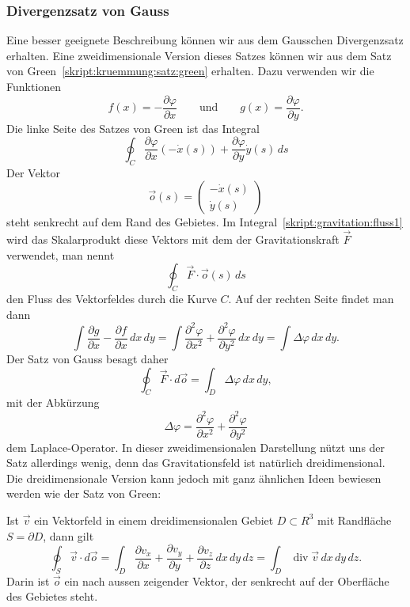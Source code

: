 \subsubsection{Divergenzsatz von Gauss}
Eine besser geeignete Beschreibung können wir aus dem Gausschen
Divergenzsatz erhalten.
Eine zweidimensionale Version dieses Satzes können wir
aus dem Satz von Green~\eqref{skript:kruemmung:satz:green}
erhalten.
Dazu verwenden wir die Funktionen 
\[
f(x)=-\frac{\partial \varphi}{\partial x}
\qquad\text{und}\qquad
g(x)=\frac{\partial \varphi}{\partial y}.
\]
Die linke Seite des Satzes von Green ist das Integral
\begin{equation}
\oint_{C}
\frac{\partial \varphi}{\partial x} (-\dot x(s))
+
\frac{\partial \varphi}{\partial y} \dot y(s)
\,ds
\label{skript:gravitation:fluss1}
\end{equation}
Der Vektor
\[
\vec o(s) = \begin{pmatrix}-\dot x(s)\\\dot y(s)\end{pmatrix}
\]
steht senkrecht auf dem Rand des Gebietes.
Im Integral~\eqref{skript:gravitation:fluss1} wird das Skalarprodukt
diese Vektors mit dem der Gravitationskraft $\vec F$ verwendet,
man nennt
\[
\oint_{C} \vec F\cdot \vec o(s)\,ds
\]
den Fluss des Vektorfeldes durch die Kurve $C$.
Auf der rechten Seite findet man dann 
\[
\int \frac{\partial g}{\partial x}-\frac{\partial f}{\partial x}\,dx\,dy
=
\int
\frac{\partial^2\varphi}{\partial x^2}
+
\frac{\partial^2\varphi}{\partial y^2}
\,dx\,dy
=
\int\Delta\varphi \,dx\,dy.
\]
Der Satz von Gauss besagt daher
\[
\oint_{C} \vec F\cdot d\vec o
=
\int_{D} \Delta\varphi\,dx\,dy,
\]
mit der Abkürzung
\begin{equation*}
\Delta \varphi
=
\frac{\partial^2\varphi}{\partial x^2}+
\frac{\partial^2\varphi}{\partial y^2}
\end{equation*}
dem Laplace-Operator.
In dieser zweidimensionalen Darstellung nützt uns der Satz allerdings
wenig, denn das Gravita\-tions\-feld ist natürlich dreidimensional.
Die dreidimensionale Version kann jedoch mit ganz ähnlichen Ideen
bewiesen werden wie der Satz von Green:

\begin{satz}[Gauss]
\label{skript:gravitation:gausssatz}
Ist $\vec v$ ein Vektorfeld in
einem dreidimensionalen Gebiet $D\subset R^3$ mit Randfläche $S=\partial D$,
dann gilt
\begin{equation}
\oint_S \vec v\cdot d\vec o
=
\int_D 
\frac{\partial v_x}{\partial x}
+
\frac{\partial v_y}{\partial y}
+
\frac{\partial v_z}{\partial z}
\,dx\,dy\,dz
=
\int_D \operatorname{div}\vec v\,dx\,dy\,dz.
\label{skript:gravitation:gausssatzf}
\end{equation}
Darin ist $\vec o$ ein nach aussen zeigender Vektor, der
senkrecht auf der Oberfläche des Gebietes steht.
\end{satz}


